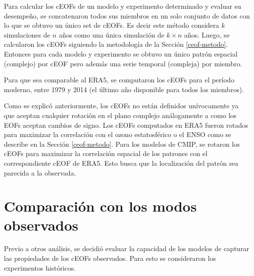 \documentclass[12pt,oneside,a4paper]{reedthesis}
\begin{document}
Para calcular los cEOFs de un modelo y experimento determinado y evaluar su desempeño, se concatenaron todos sus miembros en un solo conjunto de datos con lo que se obtuvo un único set de cEOFs.
Es decir este método considera \(k\) simulaciones de \(n\) años como una única simulación de \(k\times n\) años.
Luego, se calcularon los cEOFs siguiendo la metodología de la Sección \ref{ceof-metodo}.
Entonces para cada modelo y experimento se obtuvo un único patrón espacial (complejo) por cEOF pero además una serie temporal (compleja) por miembro.

Para que sea comparable al ERA5, se computaron los cEOFs para el período moderno, entre 1979 y 2014 (el último año disponible para todos los miembros).

Como se explicó anteriormente, los cEOFs no están definidos unívocamente ya que aceptan cualquier rotación en el plano complejo análogamente a como los EOFs aceptan cambios de signo.
Los cEOFs computados en ERA5 fueron rotados para maximizar la correlación con el ozono estatosférico o el ENSO como se describe en la Sección \ref{ceof-metodo}.
Para los modelos de CMIP, se rotaron los cEOFs para maximizar la correlación espacial de los patrones con el correspondiente cEOF de ERA5.
Esto busca que la localización del patrón sea parecida a la observada.

\hypertarget{comparaciuxf3n-con-los-modos-observados}{%
\section{Comparación con los modos observados}\label{comparaciuxf3n-con-los-modos-observados}}

Previo a otros análisis, se decidió evaluar la capacidad de los modelos de capturar las propiedades de los cEOFs observados.
Para esto se consideraron los experimentos históricos.
\end{document}
